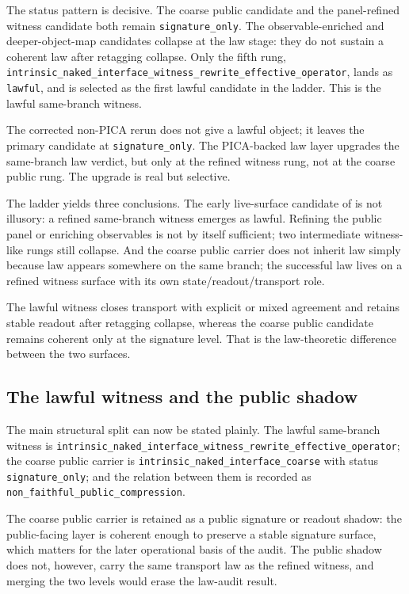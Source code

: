 \documentclass[11pt]{article}
\theoremstyle{definition}
\begin{document}
The status pattern is decisive. The coarse public candidate and the panel-refined
witness candidate both remain \texttt{signature\_only}. The observable-enriched and
deeper-object-map candidates collapse at the law stage: they do not sustain a coherent
law after retagging collapse. Only the fifth rung,
\nolinkurl{intrinsic_naked_interface_witness_rewrite_effective_operator}, lands as
\texttt{lawful}, and is selected as the first lawful candidate in the ladder. This is
the lawful same-branch witness.

The corrected non-PICA rerun does not give a lawful object; it leaves the primary
candidate at \texttt{signature\_only}. The PICA-backed law layer upgrades the
same-branch law verdict, but only at the refined witness rung, not at the coarse
public rung. The upgrade is real but selective.

The ladder yields three conclusions. The early live-surface candidate of
 is not illusory: a refined same-branch witness
emerges as lawful. Refining the public panel or enriching observables is not by itself
sufficient; two intermediate witness-like rungs still collapse. And the coarse public
carrier does not inherit law simply because law appears somewhere on the same branch;
the successful law lives on a refined witness surface with its own
state/readout/transport role.

The lawful witness closes transport with explicit or mixed agreement and retains
stable readout after retagging collapse, whereas the coarse public candidate remains
coherent only at the signature level. That is the law-theoretic difference between
the two surfaces.

\subsection{The lawful witness and the public shadow}

The main structural split can now be stated plainly. The lawful same-branch witness is
\nolinkurl{intrinsic_naked_interface_witness_rewrite_effective_operator}; the coarse
public carrier is \nolinkurl{intrinsic_naked_interface_coarse} with status
\texttt{signature\_only}; and the relation between them is recorded as
\nolinkurl{non_faithful_public_compression}.

The coarse public carrier is retained as a public signature or readout shadow: the
public-facing layer is coherent enough to preserve a stable signature surface, which
matters for the later operational basis of the audit. The public shadow does not,
however, carry the same transport law as the refined witness, and merging the two
levels would erase the law-audit result.
\end{document}
